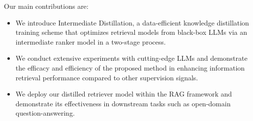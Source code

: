 Our main contributions are:
\begin{itemize}
    \setlength{\itemsep}{-2pt}
    \item We introduce Intermediate Distillation, a data-efficient knowledge distillation training scheme that optimizes retrieval models from black-box LLMs via an intermediate ranker model in a two-stage process.
    \item We conduct extensive experiments with cutting-edge LLMs and demonstrate the efficacy and efficiency of the proposed method in enhancing information retrieval performance compared to other supervision signals.
    \item We deploy our distilled retriever model within the RAG framework and demonstrate its effectiveness in downstream tasks such as open-domain question-answering.
   
\end{itemize}






